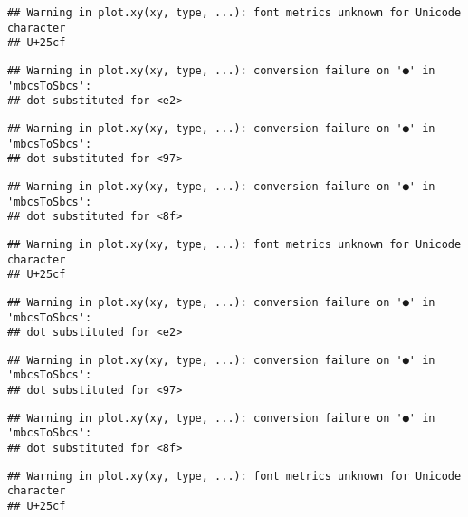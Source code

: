 \documentclass[
]{article}
\newenvironment{Shaded}{\begin{snugshade}}{\end{snugshade}}
\newcommand{\AttributeTok}[1]{\textcolor[rgb]{0.77,0.63,0.00}{#1}}
\newcommand{\FunctionTok}[1]{\textcolor[rgb]{0.00,0.00,0.00}{#1}}
\newcommand{\NormalTok}[1]{#1}
\newcommand{\SpecialCharTok}[1]{\textcolor[rgb]{0.00,0.00,0.00}{#1}}
\newcommand{\StringTok}[1]{\textcolor[rgb]{0.31,0.60,0.02}{#1}}
\begin{document}
\begin{verbatim}
## Warning in plot.xy(xy, type, ...): font metrics unknown for Unicode character
## U+25cf
\end{verbatim}

\begin{verbatim}
## Warning in plot.xy(xy, type, ...): conversion failure on '●' in 'mbcsToSbcs':
## dot substituted for <e2>
\end{verbatim}

\begin{verbatim}
## Warning in plot.xy(xy, type, ...): conversion failure on '●' in 'mbcsToSbcs':
## dot substituted for <97>
\end{verbatim}

\begin{verbatim}
## Warning in plot.xy(xy, type, ...): conversion failure on '●' in 'mbcsToSbcs':
## dot substituted for <8f>
\end{verbatim}

\begin{verbatim}
## Warning in plot.xy(xy, type, ...): font metrics unknown for Unicode character
## U+25cf
\end{verbatim}

\begin{verbatim}
## Warning in plot.xy(xy, type, ...): conversion failure on '●' in 'mbcsToSbcs':
## dot substituted for <e2>
\end{verbatim}

\begin{verbatim}
## Warning in plot.xy(xy, type, ...): conversion failure on '●' in 'mbcsToSbcs':
## dot substituted for <97>
\end{verbatim}

\begin{verbatim}
## Warning in plot.xy(xy, type, ...): conversion failure on '●' in 'mbcsToSbcs':
## dot substituted for <8f>
\end{verbatim}

\begin{verbatim}
## Warning in plot.xy(xy, type, ...): font metrics unknown for Unicode character
## U+25cf
\end{verbatim}

\begin{Shaded}
\end{Shaded}
\end{document}
